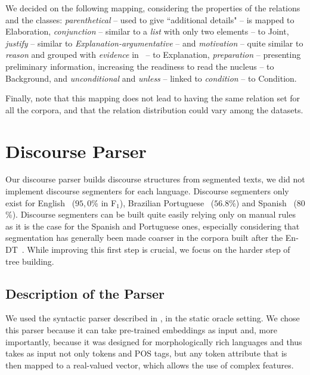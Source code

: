 \documentclass[11pt]{article}
\newcommand{\enrst}{En-DT}
\newcommand{\rel}[1]{\textit{#1}}
\newcommand{\crel}[1]{{\sc #1}\xspace}
\begin{document}
We decided on the following mapping, considering the properties of the relations and the classes: \rel{parenthetical} -- used to give ``additional details" -- is mapped to \crel{Elaboration}, 
\rel{conjunction} -- similar to a \rel{list} with only two elements -- to \crel{Joint}, 
\rel{justify} -- similar to \rel{Explanation-argumentative} -- and \rel{motivation} -- quite similar to \rel{reason} and grouped with \rel{evidence} in~\cite{benamara:mapping:2015} -- to \crel{Explanation},  
\rel{preparation} -- presenting preliminary information, increasing the readiness to read the nucleus -- to \crel{Background}, 
and \rel{unconditional} and \rel{unless} -- linked to \rel{condition} -- to \crel{Condition}.

Finally, note that this mapping does not lead to having the same relation set for all the corpora, and that the relation distribution could vary among the datasets.


\section{Discourse Parser}
\label{sec:parser}


Our discourse parser builds discourse structures from segmented texts, we did not implement discourse segmenters for each language. Discourse segmenters only exist for English~\cite{duverle:hilda:2010} ($95,0$\% in F$_1$), Brazilian Portuguese~\cite{pardo:development:2008} ($56.8$\%) and Spanish~\cite{dacunha:diseg:2010,cunha:diseg:2012} ($80$\%). Discourse segmenters can be built quite easily relying only on manual rules as it is the case for the Spanish and Portuguese ones, especially considering that segmentation has generally been made coarser in the corpora built after the \enrst~\cite{vliet:building:2011}. While improving this first step is crucial, we focus on the harder step of tree building. 

\subsection{Description of the Parser}

We used the syntactic parser described in , in the static oracle setting.
We chose this parser because it can take pre-trained embeddings as input and, more importantly,
because it was designed for morphologically rich languages and thus takes as input not only tokens and POS tags,
but any token attribute that is then mapped to a real-valued vector, which allows the use of complex features.
\end{document}
